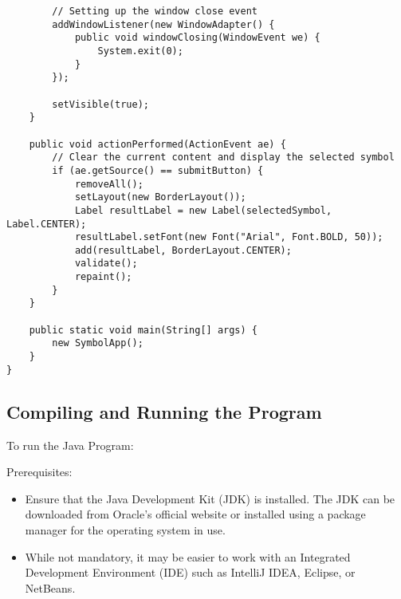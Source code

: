 \begin{mdframed}
\begin{verbatim}
        // Setting up the window close event
        addWindowListener(new WindowAdapter() {
            public void windowClosing(WindowEvent we) {
                System.exit(0);
            }
        });

        setVisible(true);
    }

    public void actionPerformed(ActionEvent ae) {
        // Clear the current content and display the selected symbol
        if (ae.getSource() == submitButton) {
            removeAll();
            setLayout(new BorderLayout());
            Label resultLabel = new Label(selectedSymbol, Label.CENTER);
            resultLabel.setFont(new Font("Arial", Font.BOLD, 50));
            add(resultLabel, BorderLayout.CENTER);
            validate();
            repaint();
        }
    }

    public static void main(String[] args) {
        new SymbolApp();
    }
}
\end{verbatim}
\end{mdframed}


\subsection{Compiling and Running the Program}
To run the Java Program:

Prerequisites:
\begin{itemize}
    \item Ensure that the Java Development Kit (JDK) is installed. The JDK can be downloaded from Oracle's official website or installed using a package manager for the operating system in use.
    \item While not mandatory, it may be easier to work with an Integrated Development Environment (IDE) such as IntelliJ IDEA, Eclipse, or NetBeans.
\end{itemize}

